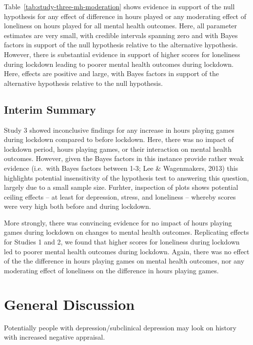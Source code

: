 \documentclass[
  english,
  man,floatsintext]{apa6}
\begin{document}
Table~\ref{tab:study-three-mh-moderation} shows evidence in support of the null hypothesis for any effect of difference in hours played or any moderating effect of loneliness on hours played for all mental health outcomes. Here, all parameter estimates are very small, with credible intervals spanning zero and with Bayes factors in support of the null hypothesis relative to the alternative hypothesis. However, there is substantial evidence in support of higher scores for loneliness during lockdown leading to poorer mental health outcomes during lockdown. Here, effects are positive and large, with Bayes factors in support of the alternative hypothesis relative to the null hypothesis.

\hypertarget{interim-summary-2}{%
\subsection{Interim Summary}\label{interim-summary-2}}

Study 3 showed inconclusive findings for any increase in hours playing games during lockdown compared to before lockdown. Here, there was no impact of lockdown period, hours playing games, or their interaction on mental health outcomes. However, given the Bayes factors in this instance provide rather weak evidence (i.e.~with Bayes factors between 1-3; Lee \& Wagenmakers, 2013) this highlights potential insensitivity of the hypothesis test to answering this question, largely due to a small sample size. Furhter, inspection of plots shows potential ceiling effects -- at least for depression, stress, and loneliness -- whereby scores were very high both before and during lockdown.

More strongly, there was convincing evidence for no impact of hours playing games during lockdown on changes to mental health outcomes. Replicating effects for Studies 1 and 2, we found that higher scores for loneliness during lockdown led to poorer mental health outcomes during lockdown. Again, there was no effect of the the difference in hours playing games on mental health outcomes, nor any moderating effect of loneliness on the difference in hours playing games.

\hypertarget{general-discussion}{%
\section{General Discussion}\label{general-discussion}}

Potentially people with depression/subclinical depression may look on history with increased negative appraisal.
\end{document}

